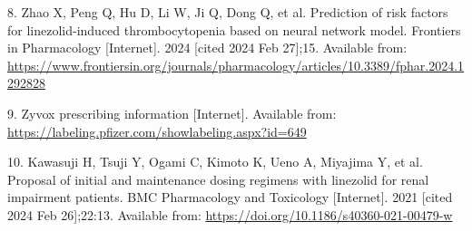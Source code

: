 \documentclass[
  letterpaper,
  DIV=11,
  numbers=noendperiod]{scrartcl}
\newlength{\cslhangindent}
\newenvironment{CSLReferences}[2] %
 {\begin{list}{}{%
  \setlength{\itemindent}{0pt}
  \setlength{\leftmargin}{0pt}
  \setlength{\parsep}{0pt}
  \ifodd #1
   \setlength{\leftmargin}{\cslhangindent}
   \setlength{\itemindent}{-1\cslhangindent}
  \fi
  \setlength{\itemsep}{#2\baselineskip}}}
 {\end{list}}
\begin{document}
\begin{CSLReferences}{0}{1}
8. Zhao X, Peng Q, Hu D, Li W, Ji Q, Dong Q, et al. Prediction of risk
factors for linezolid-induced thrombocytopenia based on neural network
model. Frontiers in Pharmacology {[}Internet{]}. 2024 {[}cited 2024 Feb
27{]};15. Available from:
\url{https://www.frontiersin.org/journals/pharmacology/articles/10.3389/fphar.2024.1292828}

9. Zyvox prescribing information {[}Internet{]}. Available from:
\url{https://labeling.pfizer.com/showlabeling.aspx?id=649}

10. Kawasuji H, Tsuji Y, Ogami C, Kimoto K, Ueno A, Miyajima Y, et al.
Proposal of initial and maintenance dosing regimens with linezolid for
renal impairment patients. BMC Pharmacology and Toxicology
{[}Internet{]}. 2021 {[}cited 2024 Feb 26{]};22:13. Available from:
\url{https://doi.org/10.1186/s40360-021-00479-w}

\end{CSLReferences}
\end{document}
